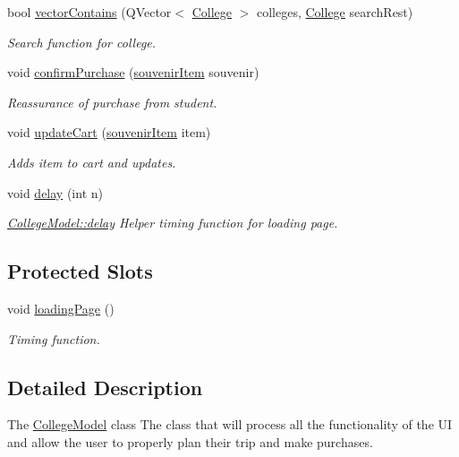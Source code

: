 \begin{DoxyCompactItemize}
bool \mbox{\hyperlink{class_college_model_a345c4e6868df90bed49e80b6783f5578}{vector\+Contains}} (Q\+Vector$<$ \mbox{\hyperlink{struct_college}{College}} $>$ colleges, \mbox{\hyperlink{struct_college}{College}} search\+Rest)
\begin{DoxyCompactList}\small\item\em Search function for college. \end{DoxyCompactList}\item 
void \mbox{\hyperlink{class_college_model_a0bf105af39d44c58b7acfc4600f739cf}{confirm\+Purchase}} (\mbox{\hyperlink{structsouvenir_item}{souvenir\+Item}} souvenir)
\begin{DoxyCompactList}\small\item\em Reassurance of purchase from student. \end{DoxyCompactList}\item 
void \mbox{\hyperlink{class_college_model_a6b2cca5127c7d95affe9870b1226a012}{update\+Cart}} (\mbox{\hyperlink{structsouvenir_item}{souvenir\+Item}} item)
\begin{DoxyCompactList}\small\item\em Adds item to cart and updates. \end{DoxyCompactList}\item 
void \mbox{\hyperlink{class_college_model_aec2e897e1a9e275308ed7889b7d94ef1}{delay}} (int n)
\begin{DoxyCompactList}\small\item\em \mbox{\hyperlink{class_college_model_aec2e897e1a9e275308ed7889b7d94ef1}{College\+Model\+::delay}} Helper timing function for loading page. \end{DoxyCompactList}\end{DoxyCompactItemize}
\subsection*{Protected Slots}
\begin{DoxyCompactItemize}
\item 
void \mbox{\hyperlink{class_college_model_ac37d99bb60d755ef0539d8e6c4481ab7}{loading\+Page}} ()
\begin{DoxyCompactList}\small\item\em Timing function. \end{DoxyCompactList}\end{DoxyCompactItemize}


\subsection{Detailed Description}
The \mbox{\hyperlink{class_college_model}{College\+Model}} class The class that will process all the functionality of the UI and allow the user to properly plan their trip and make purchases. 

